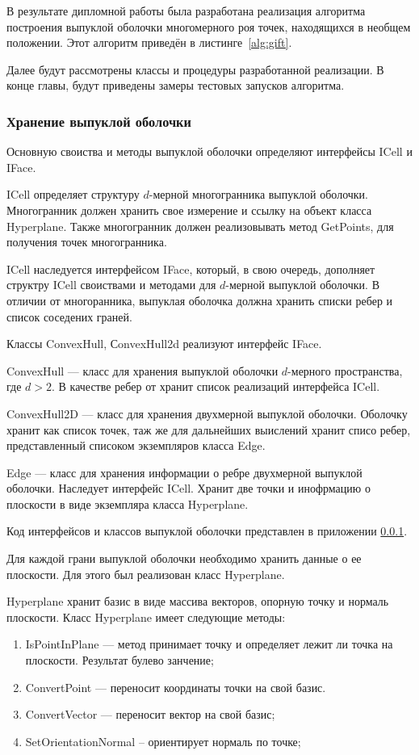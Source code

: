 \documentclass[14pt]{extarticle}
\begin{document}
В результате дипломной работы была разработана реализация алгоритма построения выпуклой оболочки многомерного роя точек, находящихся в необщем положении. Этот алгоритм приведён в листинге~\ref{alg:gift}.

Далее будут рассмотрены классы и процедуры разработанной реализации.
В конце главы, будут приведены замеры тестовых запусков алгоритма.
\subsubsection{Хранение выпуклой оболочки}

Основную своиства и методы выпуклой оболочки определяют интерфейсы ICell и IFace.

ICell определяет структуру $d$-мерной многогранника выпуклой оболочки. Многогранник должен хранить свое измерение и ссылку на объект класса Hyper\-plane. Также многогранник должен реализовывать метод GetPoints, для получения точек многогранника.

ICell наследуется интерфейсом IFace, который, в свою очередь, дополняет структру ICell своиствами и методами для $d$-мерной выпуклой оболочки.
В отличии от многоранника, выпуклая оболочка должна хранить списки ребер и список соседених граней.

Классы ConvexHull, СonvexHull2d реализуют интерфейс IFace.

ConvexHull --- класс для хранения выпуклой оболочки $d$-мерного пространства, где $d>2$. В качестве ребер от хранит список реализаций интерфейса ICell.

ConvexHull2D --- класс для хранения двухмерной выпуклой оболочки. Оболочку хранит как список точек, таж же для дальнейших выислений хранит списо ребер, представленный списоком экземпляров класса Edge.

Edge --- класс для хранения информации о ребре двухмерной выпуклой оболочки. Наследует интерфейс ICell. Хранит две точки и инофрмацию о плоскости в виде экземпляра класса Hyperplane.

Код интерфейсов и классов выпуклой оболочки представлен в приложении \ref{}.

Для каждой грани выпуклой оболочки необходимо хранить данные о ее плоскости. Для этого был реализован класс Hyperplane.

Hyperplane хранит базис в виде массива векторов, опорную точку и нормаль плоскости. Класс Hyperplane имеет следующие методы:
\begin{enumerate}[topsep=-0.5\parsep,itemsep=-0.5\parsep]
  \item IsPointInPlane --- метод принимает точку и определяет лежит ли точка на плоскости. Результат булево занчение;
  \item ConvertPoint --- переносит координаты точки на свой базис.
  \item ConvertVector --- переносит вектор на свой базис;
  \item SetOrientationNormal -- ориентирует нормаль по точке;
\end{enumerate}
\medskip
\end{document}
